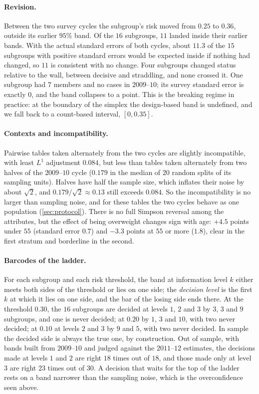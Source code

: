 \documentclass[11pt]{article}
\theoremstyle{definition}
\theoremstyle{remark}
\begin{document}
\paragraph{Revision.} Between the two survey cycles the subgroup's risk moved from $0.25$ to $0.36$, outside its earlier $95\%$ band.
Of the $16$ subgroups, $11$ landed inside their earlier bands. With the actual standard errors of both cycles, about $11.3$ of
the $15$ subgroups with positive standard errors would be expected inside if nothing had changed, so $11$ is consistent with no
change. Four subgroups changed status relative to the wall, between decisive and straddling, and none crossed it. One subgroup had $7$ members and no cases in $2009$--$10$; its survey standard error is
exactly $0$, and the band collapses to a point. This is the breaking regime in practice: at the boundary of the simplex the
design-based band is undefined, and we fall back to a count-based interval, $[0,0.35]$.

\paragraph{Contexts and incompatibility.} Pairwise tables taken alternately from the two cycles are slightly incompatible, with least
$L^1$ adjustment $0.084$, but less than tables taken alternately from two halves of the $2009$--$10$ cycle ($0.179$ in the
median of $20$ random splits of its sampling units). Halves have half the sample size, which inflates their noise by about $\sqrt2$, and $0.179/\sqrt2\approx0.13$ still
exceeds $0.084$. So the incompatibility is no larger than sampling noise, and for these tables the two cycles behave as one
population (\cref{sec:protocol}). There is no full Simpson reversal among the
attributes, but the effect of being overweight changes sign with age: $+4.5$ points under $55$ (standard error $0.7$) and $-3.3$
points at $55$ or more ($1.8$), clear in the first stratum and borderline in the second.

\paragraph{Barcodes of the ladder.} For each subgroup and each risk threshold, the band at information level $k$ either meets both sides of
the threshold or lies on one side; the \emph{decision level} is the first $k$ at which it lies on one side, and the bar of the losing side ends
there. At the threshold $0.30$, the $16$ subgroups are decided at levels $1$, $2$ and $3$ by $3$, $3$ and $9$ subgroups, and one is never decided;
at $0.20$ by $1$, $3$ and $10$, with two never decided; at $0.10$ at levels $2$ and $3$ by $9$ and $5$, with two never decided. In sample the
decided side is always the true one, by construction. Out of sample, with bands built from $2009$--$10$ and judged against the $2011$--$12$
estimates, the decisions made at levels $1$ and $2$ are right $18$ times out of $18$, and those made only at level $3$ are right $23$ times out of
$30$. A decision that waits for the top of the ladder rests on a band narrower than the sampling noise, which is the overconfidence seen
above.
\end{document}
